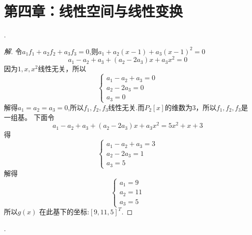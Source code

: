 \documentclass[10pt,a4paper]{report}
\title{}
\author{}
\date{}
\begin{document}
\chapter*{第四章：线性空间与线性变换}
.
\begin{proof}[解]
	令$a_{1}f_{1}+a_{2}f_{2}+a_{3}f_{3} = 0$,则$a_{1}+a_{2}(x-1)+a_{3}(x-1)^{2}=0$\\
	$$a_{1}-a_{2}+a_{3}+(a_{2}-2a_{3})x+a_{3}x^{2} = 0$$
	因为$1,x,x^{2}$线性无关，所以
	$$
	\left\{
	\begin{aligned}
	a_{1}-a_{2}+a_{3}=0 \\
	a_{2}-2a_{3}=0 \\
	a_{3}=0 
	\end{aligned}
	\right. 
	$$
	解得$a_{1}=a_{2}=a_{3}=0$,所以$f_{1},f_{2},f_{3}$线性无关.而$P_{2}[x]$的维数为3，所以$f_{1},f_{2},f_{3}$是一组基。
	下面令
	$$a_{1}-a_{2}+a_{3}+(a_{2}-2a_{3})x+a_{3}x^{2} = 5x^{2}+x+3$$
	得
	$$
	\left\{
	\begin{aligned}
	a_{1}-a_{2}+a_{3}=3 \\
	a_{2}-2a_{3}=1 \\
	a_{3}=5 
	\end{aligned}
	\right. 
	$$
	解得$$
	\left\{
	\begin{aligned}
	a_{1}=9 \\
	a_{2}=11 \\
	a_{3}=5 
	\end{aligned}
	\right. 
	$$
	所以$g(x)$ 在此基下的坐标:$[9,11,5]^{T}$.
\end{proof}
.
\end{document}
